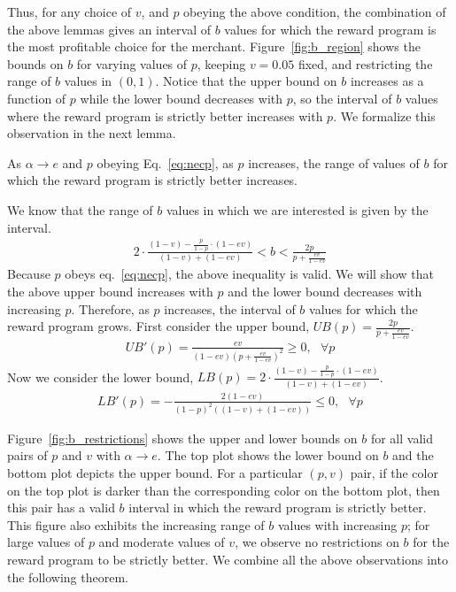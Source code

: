 Thus, for any choice of $v$, and $p$ obeying the above condition, the combination of the above lemmas gives an interval of $b$ values for which the reward program is the most profitable choice for the merchant. 
Figure~\ref{fig:b_region} shows the bounds on $b$ for varying values of $p$, keeping $v = 0.05$ fixed, and restricting the range of $b$ values in $(0,1)$. 
Notice that the upper bound on $b$ increases as a function of $p$ while the lower bound decreases with $p$, so the interval of $b$ values where the reward program is strictly better increases with $p$. 
We formalize this observation in the next lemma. 

\begin{lemma}
As $\alpha \rightarrow e$ and $p$ obeying Eq.~\ref{eq:necp}, as $p$ increases, the range of values of $b$ for which the reward program is strictly better increases.
\end{lemma}

\proof
We know that the range of $b$ values in which we are interested is given by the interval.
\begin{align*}
2\cdot \frac{(1-v) - \frac{p}{1-p}\cdot (1-ev)}{(1-v) + (1-ev)} < b < \frac{2p}{p+\frac{ev}{1-ev}}
\end{align*}
Because $p$ obeys eq.~\ref{eq:necp}, the above inequality is valid. We will show that the above upper bound increases with $p$ and the lower bound decreases with increasing $p$. Therefore, as $p$ increases, the interval of $b$ values for which the reward program grows. First consider the upper bound, $UB(p) = \frac{2p}{p+\frac{ev}{1-ev}}$.
\begin{align*}
UB'(p) = \frac{ev}{(1-ev)\left(p+\frac{ev}{1-ev} \right)^2} \geq 0, \mbox{ } \forall p
\end{align*}
Now we consider the lower bound, $LB(p) = 2\cdot \frac{(1-v) - \frac{p}{1-p}\cdot (1-ev)}{(1-v) + (1-ev)}$.
\begin{align*}
LB'(p) = -\frac{2(1-ev)}{(1-p)^2((1-v)+(1-ev))} \leq 0, \mbox{ } \forall p
\end{align*}
\endproof

Figure~\ref{fig:b_restrictions} shows the upper and lower bounds on $b$ for all valid pairs of $p$ and $v$ with $\alpha \rightarrow e$. 
The top plot shows the lower bound on $b$ and the bottom plot depicts the upper bound. 
For a particular $(p,v)$ pair, if the color on the top plot is darker than the corresponding color on the bottom plot, then this pair has a valid $b$ interval in which the reward program is strictly better. 
This figure also exhibits the increasing range of $b$ values with increasing $p$; for large values of $p$ and moderate values of $v$, we observe no restrictions on $b$ for the reward program to be strictly better. 
We combine all the above observations into the following theorem.


